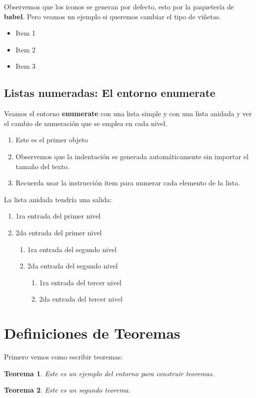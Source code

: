 \documentclass[12pt]{article}
\begin{document}
Observemos que los iconos se generan por defecto, esto por la paquetería de \textbf{babel}. Pero veamos un ejemplo si queremos cambiar el tipo de viñetas.

{\renewcommand{\labelitemi}{$\triangleright$}
\begin{itemize}
\item Item 1
\item Item 2
\item Item 3
\end{itemize}}

\subsection{Listas numeradas: El entorno enumerate}
Veamos el entorno \textbf{enumerate} con una lista simple y con una lista anidada y ver el cambio de numeración que se emplea en cada nivel.
\begin{enumerate}
    \item Este es el primer objeto
    \item Observemos que la indentación es generada automáticamente sin importar el tamaño del texto.
    \item Recuerda usar la instrucción item para numerar cada elemento de la lista.
\end{enumerate}

La lista anidada tendría una salida:
\begin{enumerate}
    \item 1ra entrada del primer nivel
    \item 2da entrada del primer nivel
    \begin{enumerate}
        \item 1ra entrada del segundo nivel
        \item 2da entrada del segundo nivel
        \begin{enumerate}
            \item 1ra entrada del tercer nivel
            \item 2da entrada del tercer nivel
        \end{enumerate}
    \end{enumerate}
\end{enumerate}

\section{Definiciones de Teoremas}
Primero vemos como escribir teoremas:
\newtheorem{thm}{Teorema}
\begin{thm}
Este es un ejemplo del entorno
para construir teoremas.
\end{thm}
\begin{thm}
Este es un segundo teorema.
\end{thm}
\end{document}
